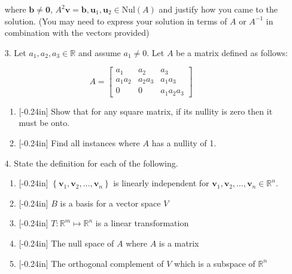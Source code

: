 \documentclass[letterpaper,12pt]{article}
\newcommand{\set}[1]{\left\{ #1 \right\}}
\theoremstyle{definition}
\begin{document}
\begin{enumerate}
    \item[] where $\mathbf{b}\neq\mathbf{0}$, $A^2\mathbf{v} =\mathbf{b}, \mathbf{u}_1,\mathbf{u}_2\in \mathrm{Nul}(A)$ and justify how you came to the solution. (You may need to express your solution in terms of $A$ or $A^{-1}$ in combination with the vectors provided)
\end{enumerate}
\newpage
\begin{enumerate}
     \item[3.] Let $a_1,a_2,a_3 \in \mathbb{R}$ and assume $a_1 \neq 0$. Let $A$ be a matrix defined as follows: 
 \end{enumerate}   
    $$A = \begin{bmatrix}
         a_1 & a_2 & a_3  \\
          a_1a_2 & a_2a_3 & a_1a_3 \\
         0 & 0 & a_1a_2a_3
     \end{bmatrix}$$
\begin{enumerate}
     \item[] \begin{enumerate}
         \item \reversemarginpar{}[-0.24in] Show that for any square matrix, if its nullity is zero then it must be onto.
         \vspace{1.4in}
         \item \reversemarginpar{}[-0.24in] Find all instances where $A$ has a nullity of 1.
     \end{enumerate}
\end{enumerate}
\newpage
\begin{enumerate}
    \item[4.] State the definition for each of the following. \begin{enumerate}
        \item\reversemarginpar{}[-0.24in] $\set{\mathbf{v}_1,\mathbf{v}_2,\ldots,\mathbf{v}_n}$ is linearly independent for $\mathbf{v}_1,\mathbf{v}_2,\ldots,\mathbf{v}_n \in \mathbb{R}^n$.
        \vspace{1.4in}
        \item\reversemarginpar{}[-0.24in] $B$ is a basis for a vector space $V$
        \vspace{1.4in}
        \item\reversemarginpar{}[-0.24in] $T:\mathbb{R}^m\mapsto \mathbb{R}^n$ is a linear transformation
        \vspace{1.4in}
        \item\reversemarginpar{}[-0.24in] The null space of $A$ where $A$ is a matrix
        \vspace{1.4in}
        \item\reversemarginpar{}[-0.24in] The orthogonal complement of $V$ which is a subspace of $\mathbb{R}^n$
    \end{enumerate}
\end{enumerate}
\end{document}
